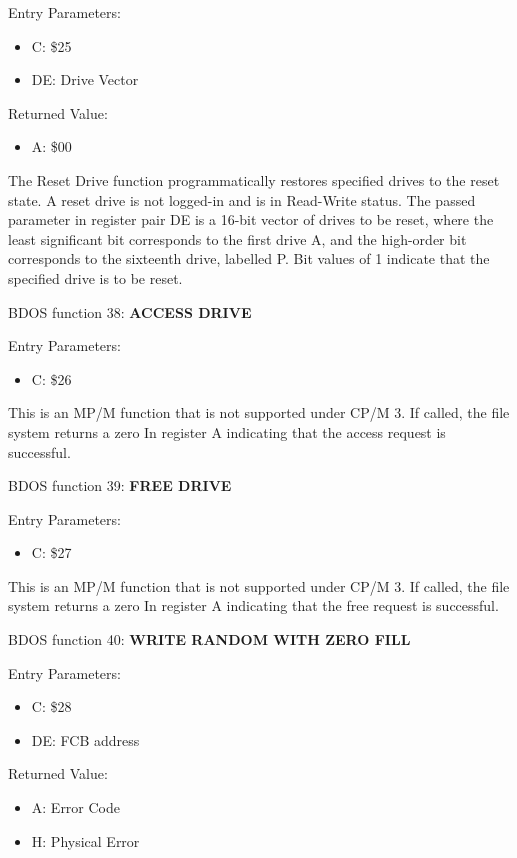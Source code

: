 Entry Parameters:
\begin{itemize}
\item[] C: \$25
\item[] DE: Drive Vector
\end{itemize}

Returned Value:
\begin{itemize}
\item[] A: \$00
\end{itemize}

The Reset Drive function programmatically restores specified drives to
the reset state. A reset drive is not logged-in and is in Read-Write
status. The passed parameter in register pair DE is a 16-bit vector of
drives to be reset, where the least significant bit corresponds to the
first drive A, and the high-order bit corresponds to the sixteenth
drive, labelled P. Bit values of 1 indicate that the specified drive
is to be reset.

BDOS function 38: \textbf{ACCESS DRIVE}

Entry Parameters:
\begin{itemize}
\item[] C: \$26
\end{itemize}

This is an MP/M function that is not supported under CP/M 3. If
called, the file system returns a zero In register A indicating that
the access request is successful.

BDOS function 39: \textbf{FREE DRIVE}

Entry Parameters:
\begin{itemize}
\item[] C: \$27
\end{itemize}

This is an MP/M function that is not supported under CP/M 3. If
called, the file system returns a zero In register A indicating that
the free request is successful.

BDOS function 40: \textbf{WRITE RANDOM WITH ZERO FILL}

Entry Parameters:
\begin{itemize}
\item[] C: \$28
\item[] DE: FCB address
\end{itemize}

Returned Value:
\begin{itemize}
\item[] A: Error Code
\item[] H: Physical Error
\end{itemize}

